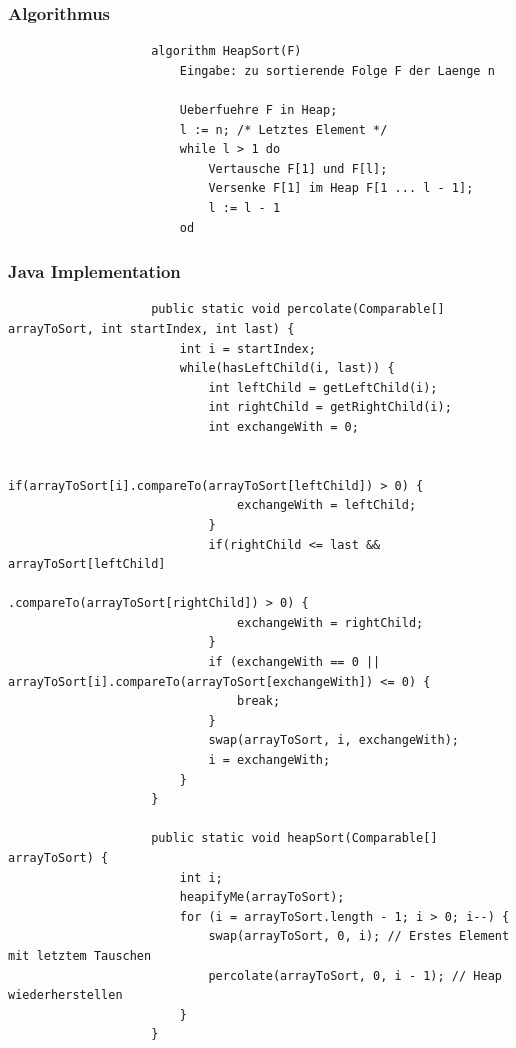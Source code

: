 \documentclass[a4paper, landscape, 8pt]{scrartcl}
\begin{document}
\begin{multicols*}{4}
                \subsubsection{Algorithmus}
                \begin{lstlisting}
                    algorithm HeapSort(F)
                        Eingabe: zu sortierende Folge F der Laenge n

                        Ueberfuehre F in Heap;
                        l := n; /* Letztes Element */
                        while l > 1 do
                            Vertausche F[1] und F[l];
                            Versenke F[1] im Heap F[1 ... l - 1];
                            l := l - 1
                        od
                \end{lstlisting}
                \subsubsection{Java Implementation}
                \begin{lstlisting}
                    public static void percolate(Comparable[] arrayToSort, int startIndex, int last) {
                        int i = startIndex;
                        while(hasLeftChild(i, last)) {
                            int leftChild = getLeftChild(i);
                            int rightChild = getRightChild(i);
                            int exchangeWith = 0;

                            if(arrayToSort[i].compareTo(arrayToSort[leftChild]) > 0) {
                                exchangeWith = leftChild;
                            }
                            if(rightChild <= last && arrayToSort[leftChild]
                                    .compareTo(arrayToSort[rightChild]) > 0) {
                                exchangeWith = rightChild;
                            }
                            if (exchangeWith == 0 || arrayToSort[i].compareTo(arrayToSort[exchangeWith]) <= 0) {
                                break;
                            }
                            swap(arrayToSort, i, exchangeWith);
                            i = exchangeWith;
                        }
                    }

                    public static void heapSort(Comparable[] arrayToSort) {
                        int i;
                        heapifyMe(arrayToSort);
                        for (i = arrayToSort.length - 1; i > 0; i--) {
                            swap(arrayToSort, 0, i); // Erstes Element mit letztem Tauschen
                            percolate(arrayToSort, 0, i - 1); // Heap wiederherstellen
                        }
                    }
                \end{lstlisting}


\end{multicols*}
\end{document}
